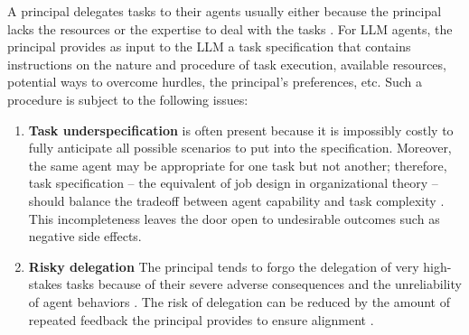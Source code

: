 \documentclass[11pt]{article}
\begin{document}
A principal delegates tasks to their agents usually either because the principal lacks the resources or the expertise to deal with the tasks \citep{castelfranchi_towards_1998,mitchell_why_2021}. For LLM agents, the principal provides as input to the LLM a task specification that contains instructions on the nature and procedure of task execution, available resources, potential ways to overcome hurdles, the principal's preferences, etc. Such a procedure is subject to the following issues:
\begin{enumerate}[wide, labelindent=0pt, itemsep=-1pt, topsep=1pt]
    \item[\textbullet] \textbf{Task underspecification} is often present because it is impossibly costly to fully anticipate all possible scenarios to put into the specification. Moreover, the same agent may be appropriate for one task but not another; therefore, task specification -- the equivalent of job design in organizational theory \citep{oldham_job_2016} -- should balance the tradeoff between agent capability and task complexity \citep{hadfield2019incomplete}. This incompleteness leaves the door open to undesirable outcomes such as negative side effects.
    \item[\textbullet] \textbf{Risky delegation} The principal tends to forgo the delegation of very high-stakes tasks because of their severe adverse consequences and the unreliability of agent behaviors \citep{lubars_ask_2019}. The risk of delegation can be reduced by the amount of repeated feedback the principal provides to ensure alignment \citep{jiang_towards_2024}.
\end{enumerate}



\end{document}
